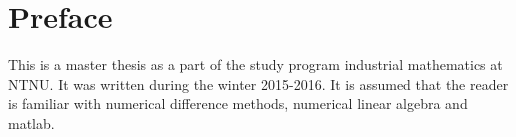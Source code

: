 \section*{Preface}
This is a master thesis as a part of the study program industrial mathematics at NTNU. It was written during the winter 2015-2016. 
It is assumed that the reader is familiar with numerical difference methods, numerical linear algebra and matlab.



